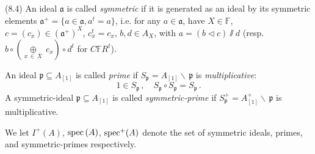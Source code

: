 \documentclass[leqno]{article}
\numberwithin{equation}{section}
\begin{document}
\bigskip

\noindent (8.4)  An ideal ${\mathfrak a}$ is called {\it symmetric} if it is generated as an ideal by its symmetric elements ${\mathfrak a}^+ = \{ a \in {\mathfrak a} , a^t = a \}$, i.e. for any $a \in {\mathfrak a}$, have $X \in {\mathbb F}$, $c = (c_x) \in ({\mathfrak a}^+)^X$, $c_x^t = c_x$, $b,d \in A_X$, with $a = (b \lhd c) \sslash d$ (resp. $b \circ \left( \underset{x \, \in \, X}{\oplus} \ c_x \right) \circ d^t$ for $C{\mathbb F} R^t$).

\bigskip

An ideal ${\mathfrak p} \subseteq A_{[1]}$ is called {\it prime} if $S_{\mathfrak p} = A_{[1]} \backslash \, {\mathfrak p}$ is {\it multiplicative}:
$$
1 \in S_{\mathfrak p} \, , \quad S_{\mathfrak p} \circ S_{\mathfrak p} = S_{\mathfrak p} \, .
$$
A symmetric-ideal ${\mathfrak p} \subseteq A_{[1]}$ is called {\it symmetric-prime} if $S_{\mathfrak p}^+ = A^+_{[1]} \backslash \, {\mathfrak p}$ is multiplicative.

\smallskip

We let $I^+ (A)$, ${\rm spec} \, (A)$, ${\rm spec}^+ (A)$ denote the set of symmetric ideals, primes, and symmetric-primes respectively.

\smallskip
\end{document}
